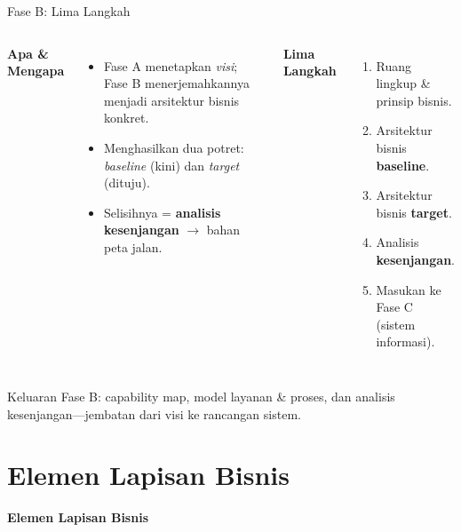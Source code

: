 \documentclass[aspectratio=169, table]{beamer}
\newcommand{\sectionframe}[1]{%
  \begin{frame}{\hfill}
    \centering
    \Huge{\textbf{#1}}
  \end{frame}
}
\newcommand{\takeaway}[1]{%
  \vspace{4pt}
  {\footnotesize #1}
}
\begin{document}
\begin{frame}{Fase B: Lima Langkah}
  \vspace{2pt}
  \footnotesize
  \begin{columns}[t]
    \textbf{Apa \& Mengapa}
    \begin{itemize}\setlength{\itemsep}{2.5pt}
      \item Fase A menetapkan \emph{visi}; Fase B menerjemahkannya menjadi
            arsitektur bisnis konkret.
      \item Menghasilkan dua potret: \emph{baseline} (kini) dan \emph{target}
            (dituju).
      \item Selisihnya = \textbf{analisis kesenjangan} $\rightarrow$ bahan peta
            jalan.
    \end{itemize}
    \textbf{Lima Langkah}
    \begin{enumerate}\setlength{\itemsep}{2.5pt}
      \item Ruang lingkup \& prinsip bisnis.
      \item Arsitektur bisnis \textbf{baseline}.
      \item Arsitektur bisnis \textbf{target}.
      \item Analisis \textbf{kesenjangan}.
      \item Masukan ke Fase C (sistem informasi).
    \end{enumerate}
  \end{columns}
  \vspace{2pt}
  \takeaway{Keluaran Fase B: capability map, model layanan \& proses, dan
  analisis kesenjangan---jembatan dari visi ke rancangan sistem.}
\end{frame}

\section{Elemen Lapisan Bisnis}
\sectionframe{Elemen Lapisan Bisnis}
\end{document}
